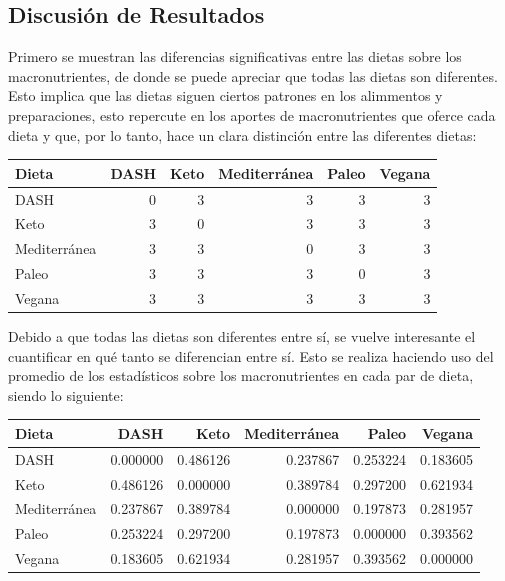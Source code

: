 \documentclass[12pt,a4paper]{article}
\begin{document}
    \subsection{Discusión de Resultados}
    {
        Primero se muestran las diferencias significativas entre las 
        dietas sobre los macronutrientes, de donde se puede apreciar 
        que todas las dietas son diferentes. Esto implica que las dietas 
        siguen ciertos patrones en los alimmentos y preparaciones, esto repercute 
        en los aportes de macronutrientes que oferce cada dieta y que, 
        por lo tanto, hace un clara distinción entre las diferentes dietas:

        \begin{center}
            \begin{tabular}{l|rrrrr}
                \toprule
                    \textbf{Dieta} & DASH & Keto & Mediterránea & Paleo & Vegana \\
                \midrule
                    DASH         & 0 & 3 & 3 & 3 & 3 \\
                    Keto         & 3 & 0 & 3 & 3 & 3 \\
                    Mediterránea & 3 & 3 & 0 & 3 & 3 \\
                    Paleo        & 3 & 3 & 3 & 0 & 3 \\
                    Vegana       & 3 & 3 & 3 & 3 & 3 \\
                \bottomrule
            \end{tabular}
        \end{center}
        
        Debido a que todas las dietas son diferentes entre sí, se vuelve interesante 
        el cuantificar en qué tanto se diferencian entre sí. Esto se realiza haciendo 
        uso del promedio de los estadísticos sobre los macronutrientes en cada par 
        de dieta, siendo lo siguiente:

        \begin{center}
            \begin{tabular}{l|rrrrr}
                \toprule
                \textbf{Dieta} & DASH & Keto & Mediterránea & Paleo & Vegana \\
                \midrule
                DASH         & 0.000000 & 0.486126 & 0.237867 & 0.253224 & 0.183605 \\
                Keto         & 0.486126 & 0.000000 & 0.389784 & 0.297200 & 0.621934 \\
                Mediterránea & 0.237867 & 0.389784 & 0.000000 & 0.197873 & 0.281957 \\
                Paleo        & 0.253224 & 0.297200 & 0.197873 & 0.000000 & 0.393562 \\
                Vegana       & 0.183605 & 0.621934 & 0.281957 & 0.393562 & 0.000000 \\
                \bottomrule
            \end{tabular}            
        \end{center}

}
\end{document}
